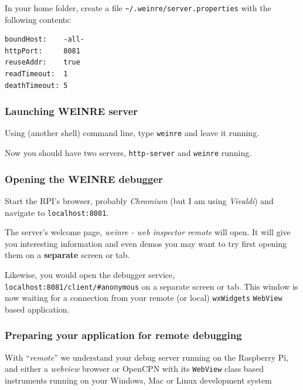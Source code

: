\documentclass[11pt]{article}
\begin{document}
    In your home folder, create a file
\texttt{\textasciitilde{}/.weinre/server.properties} with the following
contents:

    \begin{verbatim}
boundHost:    -all-
httpPort:     8081
reuseAddr:    true
readTimeout:  1
deathTimeout: 5
\end{verbatim}

    \hypertarget{launching-weinre-server}{%
\subsubsection{Launching WEINRE server}\label{launching-weinre-server}}

    Using (another shell) command line, type \texttt{weinre} and leave it
running.

    Now you should have two servers, \texttt{http-server} and
\texttt{weinre} running.

    \hypertarget{opening-the-weinre-debugger}{%
\subsubsection{Opening the WEINRE
debugger}\label{opening-the-weinre-debugger}}

    Start the RPI's browser, probably \emph{Chromium} (but I am using
\emph{Vivaldi}) and navigate to \texttt{localhost:8081}.

    The server's welcome page, \emph{weinre - web inspector remote} will
open. It will give you interesting information and even demos you may
want to try first opening them on a \textbf{separate} screen or tab.

    Likewise, you would open the debugger service,
\texttt{localhost:8081/client/\#anonymous} on a separate screen or tab.
This window is now waiting for a connection from your remote (or local)
\texttt{wxWidgets} \texttt{WebView} based application.

    \hypertarget{preparing-your-application-for-remote-debugging}{%
\subsubsection{Preparing your application for remote
debugging}\label{preparing-your-application-for-remote-debugging}}

    With ``\emph{remote}'' we understand your debug server running on the
Raspberry Pi, and either a \emph{webview} browser or OpenCPN with its
\texttt{WebView} class based instruments running on your Windows, Mac or
Linux development system
\end{document}
